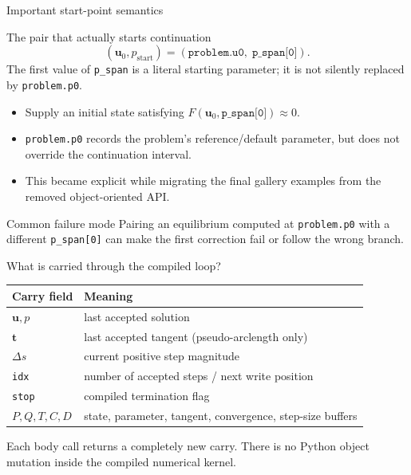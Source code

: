 \documentclass[aspectratio=169,10pt]{beamer}
\newcommand{\state}{\bm{u}}
\newcommand{\tangent}{\bm{t}}
\begin{document}
\begin{frame}{Important start-point semantics}
\begin{block}{The pair that actually starts continuation}
\[
  (\state_0,p_{\mathrm{start}})=(\texttt{problem.u0},\;\texttt{p\_span[0]}).
\]
The first value of \texttt{p\_span} is a literal starting parameter; it is not
silently replaced by \texttt{problem.p0}.
\end{block}
\begin{itemize}
  \item Supply an initial state satisfying $F(\state_0,\texttt{p\_span[0]})\approx0$.
  \item \texttt{problem.p0} records the problem's reference/default parameter, but does not override the continuation interval.
  \item This became explicit while migrating the final gallery examples from the removed object-oriented API.
\end{itemize}
\begin{alertblock}{Common failure mode}
Pairing an equilibrium computed at \texttt{problem.p0} with a different
\texttt{p\_span[0]} can make the first correction fail or follow the wrong branch.
\end{alertblock}
\end{frame}

\begin{frame}{What is carried through the compiled loop?}
\begin{center}
\begin{tabular}{ll}
\toprule
Carry field & Meaning\\
\midrule
$\state,p$ & last accepted solution\\
$\tangent$ & last accepted tangent (pseudo-arclength only)\\
$\Delta s$ & current positive step magnitude\\
\texttt{idx} & number of accepted steps / next write position\\
\texttt{stop} & compiled termination flag\\
$P,Q,T,C,D$ & state, parameter, tangent, convergence, step-size buffers\\
\bottomrule
\end{tabular}
\end{center}
Each body call returns a completely new carry. There is no Python object mutation inside the compiled numerical kernel.
\end{frame}
\end{document}
